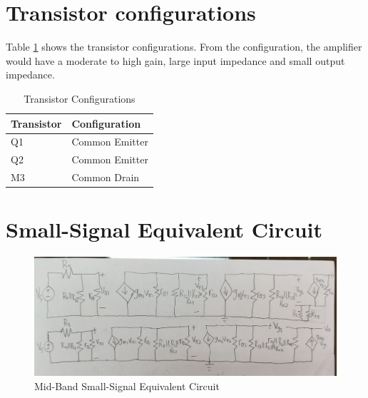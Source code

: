 \documentclass{article}
\begin{document}
\section{Transistor configurations}

Table \ref{tab:transistor-config} shows the transistor configurations.
From the configuration, the amplifier would have a moderate to high gain, large input impedance and small output impedance.

\begin{table}[h]
    \caption{Transistor Configurations}
    \label{tab:transistor-config}
    \centering
    \begin{tabular}{ l l }
        \hline
        Transistor & Configuration  \\
        \hline
        Q1         & Common Emitter \\
        Q2         & Common Emitter \\
        M3         & Common Drain   \\
        \hline
    \end{tabular}
\end{table}

\section{Small-Signal Equivalent Circuit}

\begin{figure}[H]
    \centering
    \includegraphics[height=\linewidth, angle=90]{img/small-signal-equivalent.jpeg}
    \caption{Mid-Band Small-Signal Equivalent Circuit}
    \label{fig:ss-eq-circuit}
\end{figure}
\end{document}
